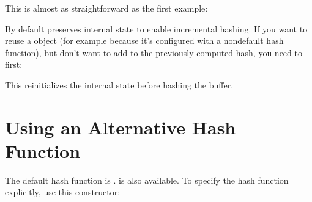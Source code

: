 \documentclass[letterpaper,10pt,english]{sphinxmanual}
\renewcommand{\sphinxcode}[1]{\texttt{\small{#1}}}
\begin{document}
This is almost as straight\sphinxhyphen{}forward as the first example:

\begin{sphinxVerbatim}[commandchars=\\\{\}]
 

  

  
 

   

  
         
        
    
\end{sphinxVerbatim}

By default \sphinxcode{} preserves internal state to enable incremental
hashing.  If you want to reuse a \sphinxcode{} object (for example
because it’s configured with a non\sphinxhyphen{}default hash function), but don’t
want to add to the previously computed hash, you need to \sphinxcode{}
first:

\begin{sphinxVerbatim}[commandchars=\\\{\}]
   
\end{sphinxVerbatim}

This reinitializes the internal state before hashing the buffer.


\section{Using an Alternative Hash Function}
\label{\detokenize{hash-functions:using-an-alternative-hash-function}}
The default hash function is .   is also available.  To specify
the hash function explicitly, use this constructor:
\end{document}

